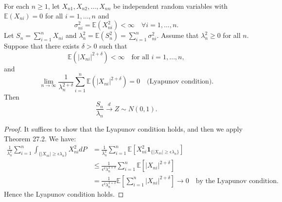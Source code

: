 \begin{theorem}
For each \(n \geq 1\), let \(X_{n1}, X_{n2}, \ldots, X_{nn}\) be independent random variables with \(\mathbb{E}(X_{ni}) = 0\) for all \(i = 1, \ldots, n\) and
\[
\sigma^2_{ni} = \mathbb{E}(X^2_{ni}) < \infty \quad \forall i = 1, \ldots, n.
\]
Let \(S_n = \sum_{i=1}^{n} X_{ni}\) and \(\lambda_n^2 = \mathbb{E}(S_n^2) = \sum_{i=1}^{n} \sigma^2_{ni}\). Assume that \(\lambda_n^2 \geq 0\) for all \(n\). Suppose that there exists \(\delta > 0\) such that
\[
\mathbb{E}(|X_{ni}|^{2+\delta}) < \infty \quad \text{for all } i = 1, \ldots, n,
\]
and
\[
\lim_{n \to \infty} \frac{1}{\lambda_n^{2+\delta}} \sum_{i=1}^{n} \mathbb{E}(|X_{ni}|^{2+\delta}) = 0 \quad \text{(Lyapunov condition)}.
\]
Then
\[
\frac{S_n}{\lambda_n} \xrightarrow{d} Z \sim N(0,1).
\]
\end{theorem}


\begin{proof}
It suffices to show that the Lyapunov condition holds, and then we apply Theorem 27.2. We have:
\begin{align*}
\frac{1}{\lambda_n^2} \sum_{i=1}^{n} \int_{\{|X_{ni}| \geq \epsilon \lambda_n\}} X_{ni}^2 dP &= \frac{1}{\lambda_n^2} \sum_{i=1}^{n} \mathbb{E}\left[ X_{ni}^2 \mathbf{1}_{\{|X_{ni}| \geq \epsilon \lambda_n\}} \right] \\
&\leq \frac{1}{\epsilon^{\delta} \lambda_n^{2+\delta}} \sum_{i=1}^{n} \mathbb{E}\left[ |X_{ni}|^{2+\delta} \right] \\
&= \frac{1}{\epsilon^{\delta} \lambda_n^{2+\delta}} \mathbb{E}\left[ \sum_{i=1}^{n} |X_{ni}|^{2+\delta} \right] \to 0 \quad \text{by the Lyapunov condition}.
\end{align*}
Hence the Lyapunov condition holds.
\end{proof}